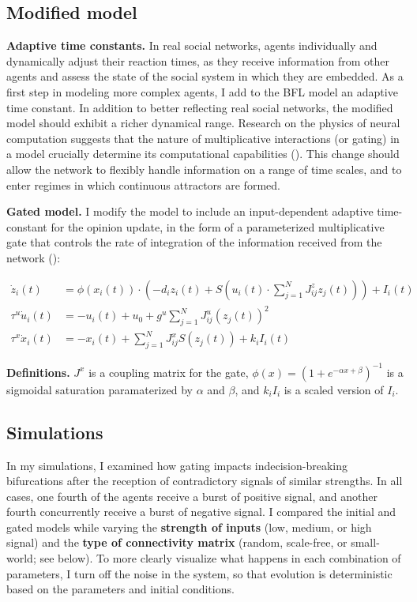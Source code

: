 \documentclass[]{article}
\begin{document}
\subsection{Modified model}

\textbf{Adaptive time constants.} In real social networks, agents individually and dynamically adjust their reaction times, as they receive information from other agents and assess the state of the social system in which they are embedded. As a first step in modeling more complex agents, I add to the BFL model an adaptive time constant. In addition to better reflecting real social networks, the modified model should exhibit a richer dynamical range. Research on the physics of neural computation suggests that the nature of multiplicative interactions (or gating) in a model crucially determine its computational capabilities (\cite{krishnamurthyTheoryGatingRecurrent2022}). This change should allow the network to flexibly handle information on a range of time scales, and to enter regimes in which continuous attractors are formed. 

\textbf{Gated model.} I modify the model to include an input-dependent adaptive time-constant for the opinion update, in the form of a parameterized multiplicative gate that controls the rate of integration of the information received from the network (\cite{krishnamurthyTheoryGatingRecurrent2022}):

\begin{align}
	\dot{z}_{i}(t) &= \phi \left( x_i(t) \right) \cdot \left( -d_{i}z_{i}(t) + S \left( u_i(t) \cdot  \sum^{N}_{j=1} J^z_{ij}z_{j}(t)  \right) \right) + I_{i}(t) \\
	\tau^u \dot{u}_i(t) &=  -u_i(t)+u_0+g^u \sum ^{N}_{j=1} J^u_{ij}(z_{j}(t))^2 \\
	\tau^x \dot{x}_i(t) &= -x_i(t) +  \sum ^{N}_{j=1} J^x_{ij} S(z_j(t)) + k_i I_i(t)
\end{align}

\textbf{Definitions.} $J^x$ is a coupling matrix for the gate, $\phi (x) = (1 + e^{- \alpha x + \beta })^{-1}$ is a sigmoidal saturation paramaterized by $\alpha$ and $\beta$, and $k_i I_i$ is a scaled version of $I_i$.

\subsection{Simulations}

In my simulations, I examined how gating impacts indecision-breaking bifurcations after the reception of contradictory signals of similar strengths. In all cases, one fourth of the agents receive a burst of positive signal, and another fourth concurrently receive a burst of negative signal. I compared the initial and gated models while varying the \textbf{strength of inputs} (low, medium, or high signal) and the \textbf{type of connectivity matrix} (random, scale-free, or small-world; see below). To more clearly visualize what happens in each combination of parameters, I turn off the noise in the system, so that evolution is deterministic based on the parameters and initial conditions.
\end{document}
